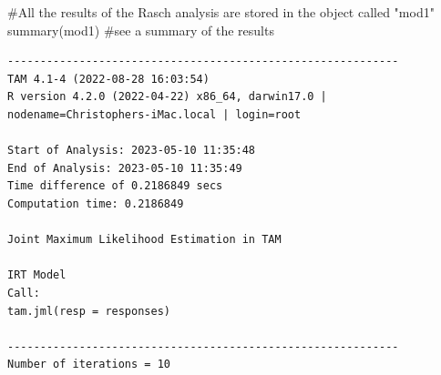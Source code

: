 \documentclass[
  letterpaper,
  DIV=11,
  numbers=noendperiod]{scrreprt}
\newenvironment{Shaded}{\begin{snugshade}}{\end{snugshade}}
\newcommand{\CommentTok}[1]{\textcolor[rgb]{0.37,0.37,0.37}{#1}}
\newcommand{\FunctionTok}[1]{\textcolor[rgb]{0.28,0.35,0.67}{#1}}
\newcommand{\NormalTok}[1]{\textcolor[rgb]{0.00,0.23,0.31}{#1}}
\begin{document}
\begin{Shaded}
\begin{Highlighting}[]
\CommentTok{\#All the results of the Rasch analysis are stored in the object called "mod1"}
\FunctionTok{summary}\NormalTok{(mod1)  }\CommentTok{\#see a summary of the results}
\end{Highlighting}
\end{Shaded}

\begin{verbatim}
------------------------------------------------------------
TAM 4.1-4 (2022-08-28 16:03:54) 
R version 4.2.0 (2022-04-22) x86_64, darwin17.0 | nodename=Christophers-iMac.local | login=root 

Start of Analysis: 2023-05-10 11:35:48 
End of Analysis: 2023-05-10 11:35:49 
Time difference of 0.2186849 secs
Computation time: 0.2186849 

Joint Maximum Likelihood Estimation in TAM 

IRT Model
Call:
tam.jml(resp = responses)

------------------------------------------------------------
Number of iterations = 10 


\end{verbatim}
\end{document}
